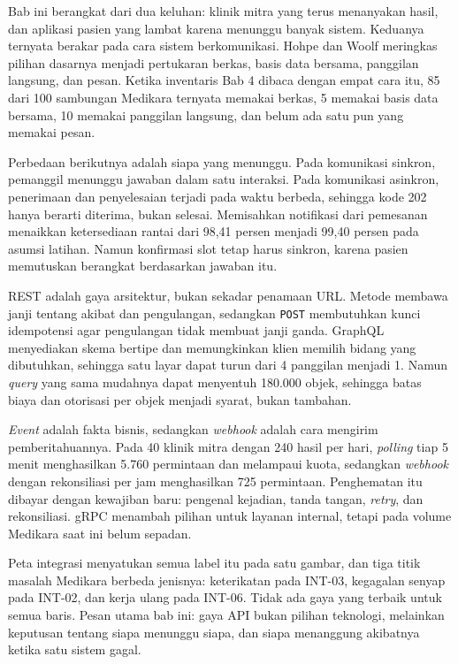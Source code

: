Bab ini berangkat dari dua keluhan: klinik mitra yang terus menanyakan hasil, dan aplikasi pasien yang lambat karena menunggu banyak sistem. Keduanya ternyata
berakar pada cara sistem berkomunikasi. Hohpe dan Woolf meringkas pilihan dasarnya menjadi pertukaran berkas, basis data bersama, panggilan langsung, dan pesan.
Ketika inventaris Bab 4 dibaca dengan empat cara itu, 85 dari 100 sambungan Medikara ternyata memakai berkas, 5 memakai basis data bersama, 10 memakai panggilan
langsung, dan belum ada satu pun yang memakai pesan.

Perbedaan berikutnya adalah siapa yang menunggu. Pada komunikasi sinkron, pemanggil menunggu jawaban dalam satu interaksi. Pada komunikasi asinkron, penerimaan dan
penyelesaian terjadi pada waktu berbeda, sehingga kode 202 hanya berarti diterima, bukan selesai. Memisahkan notifikasi dari pemesanan menaikkan ketersediaan rantai
dari 98,41 persen menjadi 99,40 persen pada asumsi latihan. Namun konfirmasi slot tetap harus sinkron, karena pasien memutuskan berangkat berdasarkan jawaban itu.

REST adalah gaya arsitektur, bukan sekadar penamaan URL. Metode membawa janji tentang akibat dan pengulangan, sedangkan \texttt{POST} membutuhkan kunci idempotensi agar
pengulangan tidak membuat janji ganda. GraphQL menyediakan skema bertipe dan memungkinkan klien memilih bidang yang dibutuhkan, sehingga satu layar dapat turun dari 4
panggilan menjadi 1. Namun \textit{query} yang sama mudahnya dapat menyentuh 180.000 objek, sehingga batas biaya dan otorisasi per objek menjadi syarat, bukan tambahan.

\textit{Event} adalah fakta bisnis, sedangkan \textit{webhook} adalah cara mengirim pemberitahuannya. Pada 40 klinik mitra dengan 240 hasil per hari, \textit{polling}
tiap 5 menit menghasilkan 5.760 permintaan dan melampaui kuota, sedangkan \textit{webhook} dengan rekonsiliasi per jam menghasilkan 725 permintaan. Penghematan itu dibayar
dengan kewajiban baru: pengenal kejadian, tanda tangan, \textit{retry}, dan rekonsiliasi. gRPC menambah pilihan untuk layanan internal, tetapi pada volume Medikara saat ini
belum sepadan.

Peta integrasi menyatukan semua label itu pada satu gambar, dan tiga titik masalah Medikara berbeda jenisnya: keterikatan pada INT-03, kegagalan senyap pada INT-02, dan kerja
ulang pada INT-06. Tidak ada gaya yang terbaik untuk semua baris. Pesan utama bab ini: gaya API bukan pilihan teknologi, melainkan keputusan tentang siapa menunggu siapa,
dan siapa menanggung akibatnya ketika satu sistem gagal.

